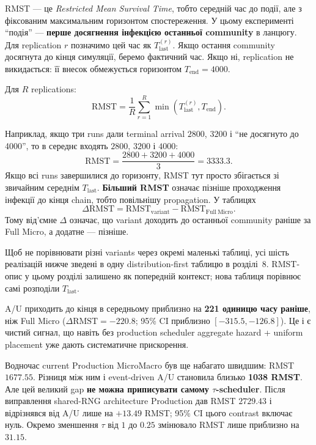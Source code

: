 \documentclass[11pt,a4paper]{article}
\begin{document}
RMST --- це \textit{Restricted Mean Survival Time}, тобто середній час до події, але з фіксованим максимальним горизонтом спостереження. У цьому експерименті ``подія'' --- \textbf{перше досягнення інфекцією останньої community} в ланцюгу. Для replication $r$ позначимо цей час як $T_{\mathrm{last}}^{(r)}$. Якщо остання community досягнута до кінця симуляції, беремо фактичний час. Якщо ні, replication не викидається: її внесок обмежується горизонтом $T_{\mathrm{end}}=4000$.

Для $R$ replications:
\[
\mathrm{RMST}
=\frac{1}{R}\sum_{r=1}^{R}
\min\!\left(T_{\mathrm{last}}^{(r)},T_{\mathrm{end}}\right).
\]

Наприклад, якщо три runs дали terminal arrival $2800$, $3200$ і ``не досягнуто до 4000'', то в середнє входять $2800$, $3200$ і $4000$:
\[
\mathrm{RMST}=\frac{2800+3200+4000}{3}=3333.3.
\]
Якщо всі runs завершилися до горизонту, RMST тут просто збігається зі звичайним середнім $T_{\mathrm{last}}$. \textbf{Більший RMST} означає пізніше проходження інфекції до кінця chain, тобто повільнішу propagation. У таблицях
\[
\Delta\mathrm{RMST}=\mathrm{RMST}_{\mathrm{variant}}-\mathrm{RMST}_{\mathrm{Full\ Micro}}.
\]
Тому від'ємне $\Delta$ означає, що variant доходить до останньої community раніше за Full Micro, а додатне --- пізніше.

\begin{tcolorbox}[colback=white,colframe=boundary,title=V4: числові результати зведені в одне місце]
Щоб не порівнювати різні variants через окремі маленькі таблиці, усі шість реалізацій нижче зведені в одну distribution-first таблицю в розділі~8. RMST-опис у цьому розділі залишено як попередній контекст; нова таблиця порівнює самі розподіли $T_{\mathrm{last}}$.
\end{tcolorbox}

A/U приходить до кінця в середньому приблизно на \textbf{221 одиницю часу раніше}, ніж Full Micro ($\Delta\mathrm{RMST}=-220.8$; 95\% CI приблизно $[-315.5,-126.8]$). Це і є чистий сигнал, що навіть без production scheduler aggregate hazard + uniform placement уже дають систематичне прискорення.

Водночас current Production MicroMacro був ще набагато швидшим: RMST $1677.55$. Різниця між ним і event-driven A/U становила близько \textbf{1038 RMST}. Але цей великий gap \textbf{не можна приписувати самому $\tau$-scheduler}. Після виправлення shared-RNG architecture Production дав RMST $2729.43$ і відрізнявся від A/U лише на $+13.49$ RMST; 95\% CI цього contrast включає нуль. Окремо зменшення $\tau$ від $1$ до $0.25$ змінювало RMST лише приблизно на $31.15$.
\end{document}
